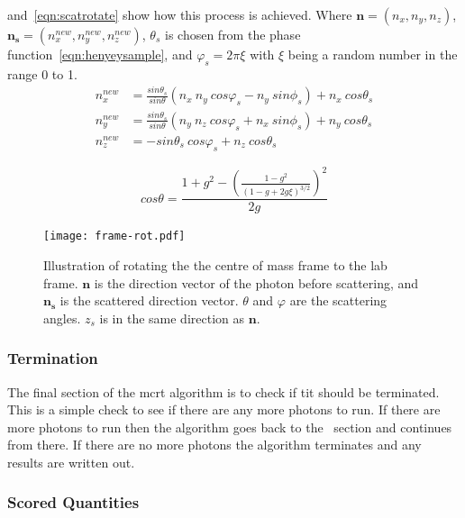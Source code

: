 \medskip

 and~\cref{eqn:scatrotate} show how this process is achieved.
Where $\mathbf{n}=(n_x,n_y,n_z)$, $\mathbf{n_s}=(n_{x}^{new},n_{y}^{new},n_{z}^{new})$, $\theta_s$ is chosen from the phase function~\cref{eqn:henyeysample}, and $\varphi_s=2\pi \xi$ with $\xi$ being a random number in the range 0 to 1.
\begin{equation}
	\begin{aligned}
		n_{x}^{new} &= \frac{sin\theta_s}{sin\theta} \left(n_x\ n_y\ cos\varphi_s - n_y\ sin\phi_s\right) + n_x\ cos\theta_s \\
		n_{y}^{new} &= \frac{sin\theta_s}{sin\theta} \left(n_y\ n_z\ cos\varphi_s + n_x\ sin\phi_s\right) + n_y\ cos\theta_s \\
		n_{z}^{new} &= -sin\theta_s\ cos\varphi_s + n_z\ cos\theta_s
	\end{aligned}
	\label{eqn:scatrotate}
\end{equation}

\begin{equation}
cos\theta = \frac{1+g^2-\left(\frac{1-g^2}{(1-g+2g\xi)^{3/2}}\right)^2}{2g}
\label{eqn:henyeysample}
\end{equation}


\begin{figure}[!ht]
	\centering
	\texttt{[image: frame-rot.pdf]}
	\caption{Illustration of rotating the the centre of mass frame to the lab frame. $\mathbf{n}$ is the direction vector of the photon before scattering, and $\mathbf{n_s}$ is the scattered direction vector. $\theta$ and $\varphi$ are the scattering angles. $z_s$ is in the same direction as $\mathbf{n}$.}
	\label{fig:labframerotate}
\end{figure}


\subsubsection*{Termination}\label{sec:terminator}

The final section of the \gls*{mcrt} algorithm is to check if tit should be terminated. This is a simple check to see if there are any more photons to run.
If there are more photons to run then the algorithm goes back to the~ section and continues from there.
If there are no more photons the algorithm terminates and any results are written out.


\subsubsection*{Scored Quantities}\label{sec:fluencecalc}

